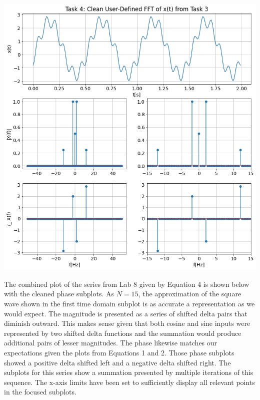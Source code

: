 \documentclass[12pt]{report}
\begin{document}
\begin{center}
	\includegraphics[scale = 0.4]{Lab 9 - Plots/Task4-3.png}\\[1.0 cm]
\end{center}

The combined plot of the series from Lab 8 given by Equation 4 is shown below with the cleaned phase subplots. As $ N = 15 $, the approximation of the square wave shown in the first time domain subplot is as accurate a representation as we would expect. The magnitude is presented as a series of shifted delta pairs that diminish outward. This makes sense given that both cosine and sine inputs were represented by two shifted delta functions and the summation would produce additional pairs of lesser magnitudes. The phase likewise matches our expectations given the plots from Equations 1 and 2. Those phase subplots showed a positive delta shifted left and a negative delta shifted right. The subplots for this series show a summation presented by multiple iterations of this sequence. The x-axis limits have been set to sufficiently display all relevant points in the focused subplots. \\
\end{document}

